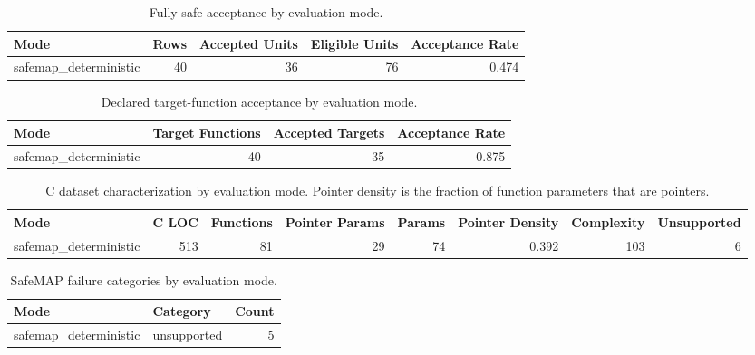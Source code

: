 \begin{table}[t]
\centering
\caption{Fully safe acceptance by evaluation mode.}
\label{tab:safemap-mode-summary}
\begin{tabular}{lrrrr}
\hline
Mode & Rows & Accepted Units & Eligible Units & Acceptance Rate \\
\hline
safemap\_deterministic & 40 & 36 & 76 & 0.474 \\
\hline
\end{tabular}
\end{table}

\begin{table}[t]
\centering
\caption{Declared target-function acceptance by evaluation mode.}
\label{tab:safemap-target-summary}
\begin{tabular}{lrrr}
\hline
Mode & Target Functions & Accepted Targets & Acceptance Rate \\
\hline
safemap\_deterministic & 40 & 35 & 0.875 \\
\hline
\end{tabular}
\end{table}

\begin{table}[t]
\centering
\caption{C dataset characterization by evaluation mode. Pointer density is the fraction of function parameters that are pointers.}
\label{tab:safemap-dataset-characterization}
\begin{tabular}{lrrrrrrr}
\hline
Mode & C LOC & Functions & Pointer Params & Params & Pointer Density & Complexity & Unsupported \\
\hline
safemap\_deterministic & 513 & 81 & 29 & 74 & 0.392 & 103 & 6 \\
\hline
\end{tabular}
\end{table}

\begin{table}[t]
\centering
\caption{SafeMAP failure categories by evaluation mode.}
\label{tab:safemap-failure-summary}
\begin{tabular}{llr}
\hline
Mode & Category & Count \\
\hline
safemap\_deterministic & unsupported & 5 \\
\hline
\end{tabular}
\end{table}

